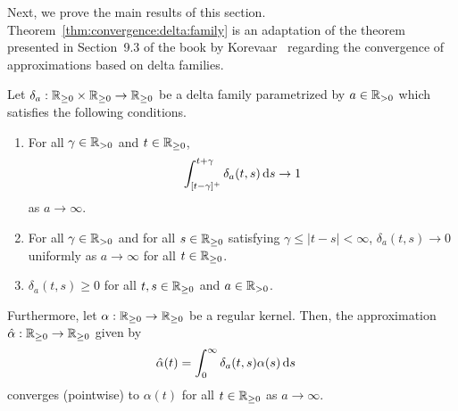 %
Next, we prove the main results of this section. Theorem~\ref{thm:convergence:delta:family} is an adaptation of the theorem presented in Section~9.3 of the book by Korevaar~\cite{Korevaar:1968} regarding the convergence of approximations based on delta families.
%
\begin{theorem}\label{thm:convergence:delta:family}
	Let $\delta_a: \mathbb{R}_{\geq 0} \times \mathbb{R}_{\geq 0} \rightarrow \mathbb{R}_{\geq 0}$ be a delta family parametrized by $a \in \mathbb{R}_{> 0}$ which satisfies the following conditions.
	\begin{enumerate}
		\item For all $\gamma \in \mathbb{R}_{> 0}$ and $t \in \mathbb{R}_{\geq 0}$,
		\begin{align}
			\int_{[t - \gamma]^+}^{t + \gamma} \delta_a(t, s) \,\mathrm{d} s \rightarrow 1
		\end{align}
		as $a \rightarrow \infty$.
		\item For all $\gamma \in \mathbb{R}_{> 0}$ and for all $s \in \mathbb{R}_{\geq 0}$ satisfying $\gamma \leq |t-s| < \infty$, $\delta_a(t, s) \rightarrow 0$ uniformly as $a \rightarrow \infty$ for all $t \in \mathbb{R}_{\geq 0}$.
		\item $\delta_a(t, s) \geq 0$ for all $t, s \in \mathbb{R}_{\geq 0}$ and $a \in \mathbb{R}_{> 0}$.
	\end{enumerate}
	Furthermore, let $\alpha: \mathbb{R}_{\geq 0} \rightarrow \mathbb{R}_{\geq 0}$ be a regular kernel.
	Then, the approximation $\hat \alpha: \mathbb{R}_{\geq 0} \rightarrow \mathbb{R}_{\geq 0}$ given by
	\begin{align}\label{eq:theorem:approximation}
		\hat \alpha(t) &= \int_0^\infty \delta_a(t, s) \alpha(s) \,\mathrm{d} s
	\end{align}
	converges (pointwise) to $\alpha(t)$ for all $t \in \mathbb{R}_{\geq 0}$ as $a \rightarrow \infty$.
\end{theorem}
%
